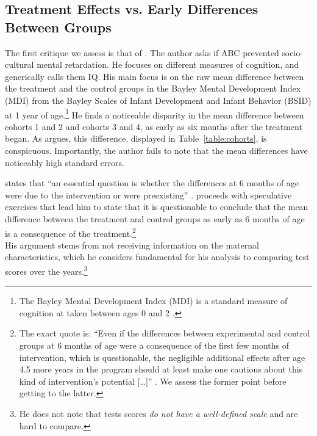 \begin{appendices}
\subsection{Treatment Effects vs. Early Differences Between Groups}

\noindent The first critique we assess is that of \citet{Spitz_1992_ABC-Retardation}. The author asks if ABC prevented socio-cultural mental retardation. He focuses on different measures of cognition, and generically calls them IQ. His main focus is on the raw mean difference between the treatment and the control groups in the Bayley Mental Development Index (MDI) from the Bayley Scales of Infant Development and Infant Behavior (BSID) at 1 year of age.\footnote{The Bayley Mental Development Index (MDI) is a standard measure of cognition at taken between ages 0 and 2 \citep{Childrens-Health_2016_Bayley-Scales}.} He finds a noticeable disparity in the mean difference between cohorts 1 and 2 and cohorts 3 and 4, as early as six months after the treatment began. As \citet{Spitz_1992_ABC-Retardation} argues, this difference, displayed in Table~\ref{table:cohorts}, is conspicuous. Importantly, the author fails to note that the mean differences have noticeably high standard errors.



\noindent \citet{Spitz_1992_ABC-Retardation} states that ``an essential question is whether the differences at 6 months of age were due to the intervention or were preexisting'' \citep[][p. 230]{Spitz_1992_ABC-Retardation}. \citet{Spitz_1992_ABC-Retardation} proceeds with speculative exercises that lead him to state that it is questionable to conclude that the mean difference between the treatment and control groups as early as 6 months of age is a consequence of the treatment.\footnote{The exact quote is: ``Even if the differences between experimental and control groups at 6 months of age were a consequence of the first few months of intervention, which is questionable, the negligible additional effects after age 4.5 more years in the program should at least make one cautious about this kind of intervention's potential [\ldots]'' \citep[][p. 235]{Spitz_1992_ABC-Retardation}. We assess the former point before getting to the latter.}\\

\noindent His argument stems from not receiving information on the maternal characteristics, which he considers fundamental for his analysis to comparing test scores over the years.\footnote{He does not note that tests scores \textit{do not have a well-defined scale} and are hard to compare.}\\


\end{appendices}
